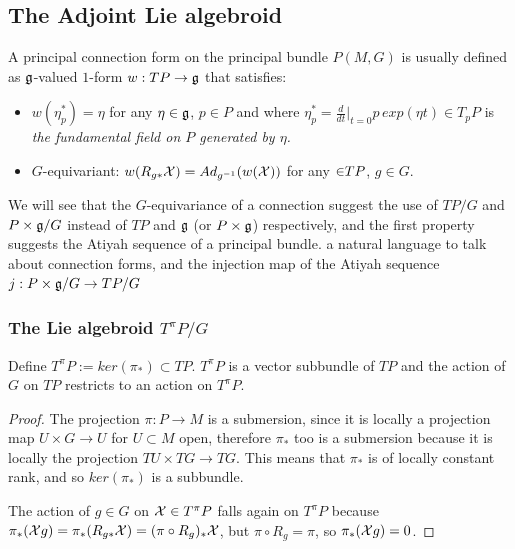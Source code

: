 \subsection{The Adjoint Lie algebroid}

A principal connection form on the principal bundle $P(M, G)$ is usually defined as $\mathfrak{g}$-valued $1$-form  $w: TP \to \mathfrak{g}$ that satisfies:

    \begin{itemize}
    
    \item $w(\eta_p^*) = \eta$ for any $\eta \in \mathfrak{g}$, $p \in P$ and where $\eta_p^* = \frac{d}{dt}\bigr|_{t = 0} p\,exp(\eta t)\in T_p P$ is \emph{the fundamental field on $P$ generated by $\eta$.}
    
    \item $G$-equivariant: $w(R_{g*} \mathcal{X}) = Ad_{g^{-1}}( w(\mathcal{X}))$ for any $\mathcal{\in} TP$, $g \in G$.
    
    \end{itemize}

We will see that the $G$-equivariance of a connection suggest the use of $TP/G$ and $P \times \mathfrak{g} / G$ instead of $TP$ and $\mathfrak{g}$ (or $P \times \mathfrak{g}$) respectively, and the first property suggests the Atiyah sequence of a principal bundle. a natural language to talk about connection forms, and the injection map of the Atiyah sequence $j: P \times \mathfrak{g}/G \to TP/G$%

\subsubsection{The Lie algebroid $T^\pi P/G$}

\begin{lemma}
Define $T^\pi P := ker(\pi_*) \subset TP$. $T^\pi P$ is a vector subbundle of $TP$ and the action of $G$ on $TP$ restricts to an action on $T^\pi P$.
\end{lemma}

\begin{proof}
The projection $\pi:P \to M$ is a submersion, since it is locally a projection map $U \times G \to U$ for $U \subset M$ open, therefore $\pi_*$ too is a submersion because it is locally the projection $TU \times TG \to TG$. This means that $\pi_*$ is of locally constant rank, and so $ker(\pi_*)$ is a subbundle.

The action of $g \in G$ on $\mathcal{X} \in T^\pi P$ falls again on $T^\pi P$ because $\pi_*(\mathcal{X}g) = \pi_*(R_{g*} \mathcal{X}) = (\pi \circ R_g)_* \mathcal{X}$, but $\pi \circ R_g = \pi$, so $\pi_*(\mathcal{X}g) = 0$.
\end{proof}


